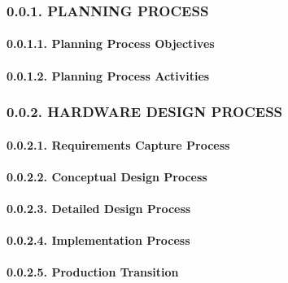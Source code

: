 \documentclass[
]{article}
\begin{document}
\hypertarget{planning-process}{%
\subsubsection{0.0.1. PLANNING PROCESS}\label{planning-process}}

\hypertarget{planning-process-objectives}{%
\paragraph{0.0.1.1. Planning Process
Objectives}\label{planning-process-objectives}}

\hypertarget{planning-process-activities}{%
\paragraph{0.0.1.2. Planning Process
Activities}\label{planning-process-activities}}

\hypertarget{hardware-design-process}{%
\subsubsection{0.0.2. HARDWARE DESIGN
PROCESS}\label{hardware-design-process}}

\hypertarget{requirements-capture-process}{%
\paragraph{0.0.2.1. Requirements Capture
Process}\label{requirements-capture-process}}

\hypertarget{conceptual-design-process}{%
\paragraph{0.0.2.2. Conceptual Design
Process}\label{conceptual-design-process}}

\hypertarget{detailed-design-process}{%
\paragraph{0.0.2.3. Detailed Design
Process}\label{detailed-design-process}}

\hypertarget{implementation-process}{%
\paragraph{0.0.2.4. Implementation
Process}\label{implementation-process}}

\hypertarget{production-transition}{%
\paragraph{0.0.2.5. Production Transition}\label{production-transition}}
\end{document}

